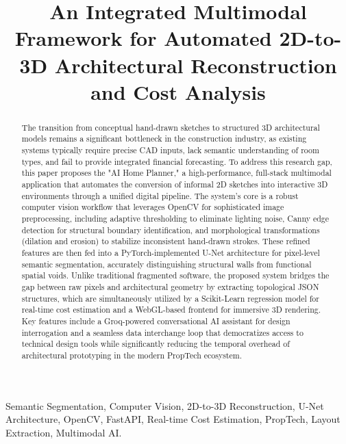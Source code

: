 \documentclass[10pt, conference, a4paper]{IEEEtran}
\begin{document}
\title{An Integrated Multimodal Framework for Automated 2D-to-3D Architectural Reconstruction and Cost Analysis}

\author{
}

\maketitle

\begin{abstract}
The transition from conceptual hand-drawn sketches to structured 3D architectural models remains a significant bottleneck in the construction industry, as existing systems typically require precise CAD inputs, lack semantic understanding of room types, and fail to provide integrated financial forecasting. To address this research gap, this paper proposes the "AI Home Planner," a high-performance, full-stack multimodal application that automates the conversion of informal 2D sketches into interactive 3D environments through a unified digital pipeline. The system’s core is a robust computer vision workflow that leverages OpenCV for sophisticated image preprocessing, including adaptive thresholding to eliminate lighting noise, Canny edge detection for structural boundary identification, and morphological transformations (dilation and erosion) to stabilize inconsistent hand-drawn strokes. These refined features are then fed into a PyTorch-implemented U-Net architecture for pixel-level semantic segmentation, accurately distinguishing structural walls from functional spatial voids. Unlike traditional fragmented software, the proposed system bridges the gap between raw pixels and architectural geometry by extracting topological JSON structures, which are simultaneously utilized by a Scikit-Learn regression model for real-time cost estimation and a WebGL-based frontend for immersive 3D rendering. Key features include a Groq-powered conversational AI assistant for design interrogation and a seamless data interchange loop that democratizes access to technical design tools while significantly reducing the temporal overhead of architectural prototyping in the modern PropTech ecosystem.
\end{abstract}

\begin{IEEEkeywords}
Semantic Segmentation, Computer Vision, 2D-to-3D Reconstruction, U-Net Architecture, OpenCV, FastAPI, Real-time Cost Estimation, PropTech, Layout Extraction, Multimodal AI.
\end{IEEEkeywords}
\end{document}
